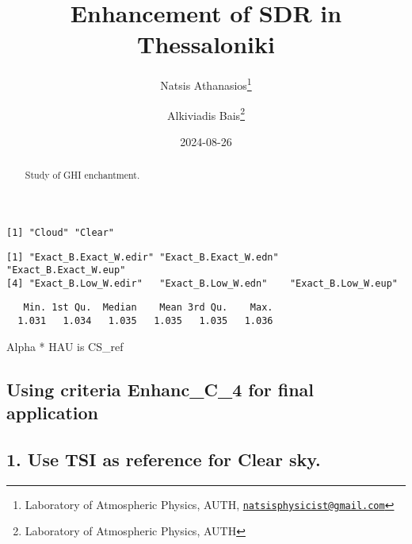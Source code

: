\documentclass[
  10pt,
  a4paper,oneside]{article}
\title{Enhancement of SDR in Thessaloniki}
\author{Natsis Athanasios\footnote{Laboratory of Atmospheric Physics, AUTH, \href{mailto:natsisphysicist@gmail.com}{\nolinkurl{natsisphysicist@gmail.com}}} \and Alkiviadis Bais\footnote{Laboratory of Atmospheric Physics, AUTH}}
\date{2024-08-26}
\begin{document}
\maketitle
\begin{abstract}
Study of GHI enchantment.
\end{abstract}

{
\hypersetup{linkcolor=}
\setcounter{tocdepth}{4}
\tableofcontents
}
\begin{verbatim}
[1] "Cloud" "Clear"
\end{verbatim}

\begin{verbatim}
[1] "Exact_B.Exact_W.edir" "Exact_B.Exact_W.edn"  "Exact_B.Exact_W.eup" 
[4] "Exact_B.Low_W.edir"   "Exact_B.Low_W.edn"    "Exact_B.Low_W.eup"   
\end{verbatim}

\begin{verbatim}
   Min. 1st Qu.  Median    Mean 3rd Qu.    Max. 
  1.031   1.034   1.035   1.035   1.035   1.036 
\end{verbatim}

Alpha * HAU is CS\_ref

\hypertarget{using-criteria-enhanc_c_4-for-final-application}{%
\subsection{\texorpdfstring{Using criteria \textbf{Enhanc\_C\_4} for final application}{Using criteria Enhanc\_C\_4 for final application}}\label{using-criteria-enhanc_c_4-for-final-application}}

\hypertarget{use-tsi-as-reference-for-clear-sky.}{%
\subsection{1. Use TSI as reference for Clear sky.}\label{use-tsi-as-reference-for-clear-sky.}}
\end{document}
